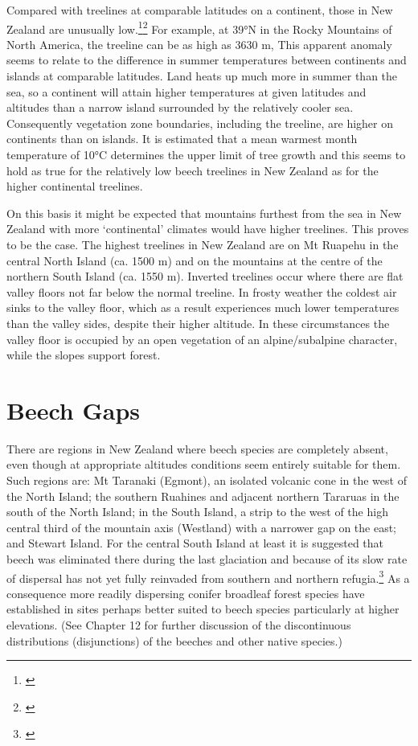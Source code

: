Compared with treelines at comparable latitudes on a continent, those in New Zealand are unusually low.\footnote{\cite{wardle1965comparison}}\footnote{\cite{wardle1971explanation}} For example, at 39°N in the Rocky Mountains of North America, the treeline can be as high as 3630 m, This apparent anomaly seems to relate to the difference in summer temperatures between continents and islands at comparable latitudes.
Land heats up much more in summer than the sea, so a continent will attain higher temperatures at given latitudes and altitudes than a narrow island surrounded by the relatively cooler sea.
Consequently vegetation zone boundaries, including the treeline, are higher on continents than on islands.
It is estimated that a mean warmest month temperature of 10°C determines the upper limit of tree growth and this seems to hold as true for the relatively low beech treelines in New Zealand as for the higher continental treelines.

On this basis it might be expected that mountains furthest from the sea in New Zealand with more `continental' climates would have higher treelines.
This proves to be the case.
The highest treelines in New Zealand are on Mt Ruapehu in the central North Island (ca. 1500 m) and on the mountains at the centre of the northern South Island (ca. 1550 m).
Inverted treelines occur where there are flat valley floors not far below the normal treeline.
In frosty weather the coldest air sinks to the valley floor, which as a result experiences much lower temperatures than the valley sides, despite their higher altitude.
In these circumstances the valley floor is occupied by an open vegetation of an alpine/subalpine character, while the slopes support forest.

\section{Beech Gaps}

There are regions in New Zealand where beech species are completely absent, even though at appropriate altitudes conditions seem entirely suitable for them.
Such regions are: Mt Taranaki (Egmont), an isolated volcanic cone in the west of the North Island; the southern Ruahines and adjacent northern Tararuas in the south of the North Island; in the South Island, a strip to the west of the high central third of the mountain axis (Westland) with a narrower gap on the east; and Stewart Island.
For the central South Island at least it is suggested that beech was eliminated there during the last glaciation and because of its slow rate of dispersal has not yet fully reinvaded from southern and northern refugia.\footnote{\cite{wardle1965comparison}}
As a consequence more readily dispersing conifer broadleaf forest species have established in sites perhaps better suited to beech species particularly at higher elevations. (See Chapter 12 for further discussion of the discontinuous distributions (disjunctions) of the beeches and other native species.)

